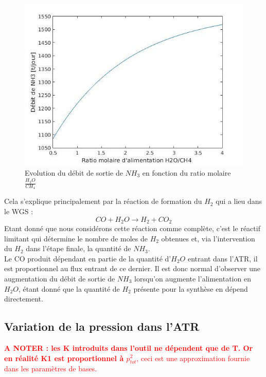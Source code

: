 \documentclass[12pt]{report}
\begin{document}
\begin{figure}[H]
\begin{center}
\includegraphics[scale=0.6]{debit_NH3_ratio_H2O}
\caption{Evolution du débit de sortie de $NH_3$ en fonction du ratio molaire $\frac{H_2O}{CH_4}$}
\end{center}
\end{figure}

Cela s'explique principalement par la réaction de formation du $H_2$ qui a lieu dans le WGS : 
\begin{equation}
CO + H_2O \rightarrow H_2 + CO_2
\end{equation}
Etant donné que nous considérons cette réaction comme complète,  c'est le réactif limitant qui détermine le nombre de moles de $H_2$ obtenues et, via l'intervention du $H_2$ dans l'étape finale, la quantité de $NH_3$.\\

Le CO produit dépendant en partie de la quantité d'$H_2O$ entrant dans l'ATR, il est proportionnel au flux entrant de ce dernier. Il est donc normal d'observer une augmentation du débit de sortie de $NH_3$ lorsqu'on augmente l'alimentation en $H_2O$, étant donné que la quantité de $H_2$ présente pour la synthèse en dépend directement.\\

\subsection{Variation de la pression dans l'ATR}

\textcolor{red}{\textbf{A NOTER : les K introduits dans l'outil ne dépendent que de T. Or en réalité K1 est proportionnel à $p_{tot}^2$}, ceci est une approximation fournie dans les paramètres de bases.\\}
\end{document}
